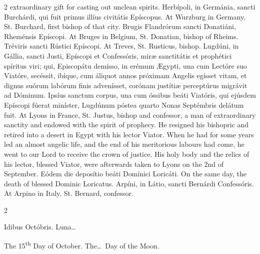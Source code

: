 \begin{paracol}{2}
 extraordinary gift for casting out unclean spirits.
\switchcolumn*
{}
Herbípoli, in Germánia, sancti Burchárdi, qui fuit primus illíus civitátis Epíscopus.
\switchcolumn
{}
At Wurzburg in Germany, St. Burchard, 
 first bishop of that city.
\switchcolumn*
{}
Brugis Flandrórum 
 sancti Donatiáni, Rheménsis Epíscopi.
\switchcolumn
{}
At Bruges in Belgium, St. Donatian, 
 bishop of Rheims.
\switchcolumn*
{}
Tréviris sancti Rústici 
 Epíscopi.
\switchcolumn
{}
At Treves, St. Rusticus, bishop.
\switchcolumn*
{}
Lugdúni, in Gállia, 
 sancti Justi, Epíscopi et Confessóris, miræ sanctitátis et prophétici 
 spíritus viri; qui, Episcopátu demísso, in erémum Ægypti, una cum Lectóre 
 suo Viatóre, secéssit, ibíque, cum áliquot annos próximam Angelis egísset 
 vitam, et dignus suórum labórum finis advenísset, corónam justítiæ 
 perceptúrus migrávit ad Dóminum. Ipsíus sanctum corpus, una cum 
 óssibus beáti Viatóris, qui ejúsdem Epíscopi fúerat miníster, Lugdúnum 
 póstea quarto Nonas Septémbris delátum fuit.
\switchcolumn
{}
At Lyons in France, St. Justus, 
 bishop and confessor, a man of extraordinary sanctity and endowed with the 
 spirit of prophecy. He resigned his bishopric and retired into a 
 desert in Egypt with his lector Viator. When he had for some years led 
 an almost angelic life, and the end of his meritorious labours had come, he 
 went to our Lord to receive the crown of justice. His holy body and 
 the relics of his lector, blessed Viator, were afterwards taken to Lyons on 
 the 2nd of September.
\switchcolumn*
{}
Eódem die deposítio 
 beáti Domínici Loricáti.
\switchcolumn
{}
On the same day, the death of 
 blessed Dominic Loricatus.
\switchcolumn*
{}
Arpíni, in Látio, 
 sancti Bernárdi Confessóris.
\switchcolumn
{}
At Arpino in Italy, St. Bernard, 
 confessor.
\switchcolumn*
{}
\end{paracol}


\begin{paracol}{2}
\begin{center}{\color{gregoriocolor} Idibus Octóbris. 
 Luna\dots\ }\end{center}
\switchcolumn
{}
\begin{center}{\color{gregoriocolor} The   15\textsuperscript{th} Day of 
 October. The\dots\ Day of the Moon.}\end{center}
\end{paracol}

